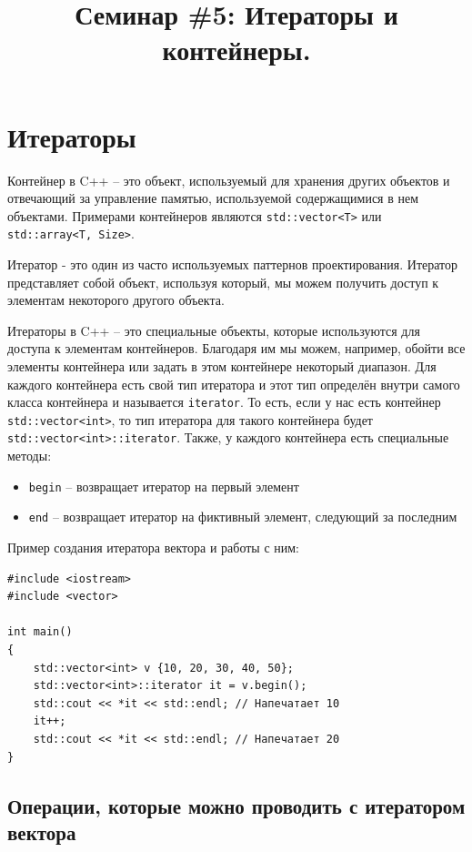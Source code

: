 \documentclass{article}
\begin{document}
\title{Семинар \#5: Итераторы и контейнеры. \vspace{-5ex}}\date{}\maketitle

\section*{Итераторы}
Контейнер в C++ -- это объект, используемый для хранения других объектов и отвечающий за управление памятью, используемой содержащимися в нем объектами. Примерами контейнеров являются \texttt{std::vector<T>} или \texttt{std::array<T, Size>}.

Итератор - это один из часто используемых паттернов проектирования.
Итератор представляет собой объект, используя который, мы можем получить доступ к элементам некоторого другого объекта.

Итераторы в C++ -- это специальные объекты, которые используются для доступа к элементам контейнеров.
Благодаря им мы можем, например, обойти все элементы контейнера или задать в этом контейнере некоторый диапазон. Для каждого контейнера есть свой тип итератора и этот тип определён внутри самого класса контейнера и называется \texttt{iterator}. То есть, если у нас есть контейнер \texttt{std::vector<int>}, то тип итератора для такого контейнера будет \texttt{std::vector<int>::iterator}.
Также, у каждого контейнера есть специальные методы:
\begin{itemize}
\item \texttt{begin} -- возвращает итератор на первый элемент
\item \texttt{end} -- возвращает итератор на фиктивный элемент, следующий за последним
\end{itemize}
Пример создания итератора вектора и работы с ним:
\begin{lstlisting}
#include <iostream>
#include <vector>

int main()
{
    std::vector<int> v {10, 20, 30, 40, 50};
    std::vector<int>::iterator it = v.begin();
    std::cout << *it << std::endl; // Напечатает 10
    it++;
    std::cout << *it << std::endl; // Напечатает 20
}
\end{lstlisting}

\subsection*{Операции, которые можно проводить с итератором вектора}
\end{document}
